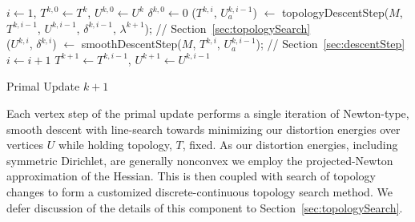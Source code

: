 \begin{algorithm}[h]
\SetAlgoLined
{}
$i \leftarrow 1$, $T^{k,0} \leftarrow T^{k}$, $U^{k,0} \leftarrow U^{k}$\;
$\delta^{k,0} \leftarrow 0$\;
{
	($T^{k,i}$, $U_a^{k,i-1}$) $\leftarrow$ topologyDescentStep($M$, $T^{k,i-1}$, $U^{k,i-1}$, $\delta^{k,i-1}$, $\lambda^{k+1}$); // Section~\ref{sec:topologySearch}\\
	($U^{k,i}$, $\delta^{k,i}$) $\leftarrow$ smoothDescentStep($M$, $T^{k,i}$, $U_a^{k,i-1}$); // Section~\ref{sec:descentStep}\\
	$i \leftarrow i+1$\;
}
$T^{k+1} \leftarrow T^{k,i-1}$, $U^{k+1} \leftarrow U^{k,i-1}$
\caption{Primal Update $k+1$}
\label{alg:DCSearch}
\end{algorithm}

Each vertex step of the primal update performs a single iteration of Newton-type, smooth descent with line-search towards minimizing our distortion energies over vertices $U$ while holding topology, $T$, fixed. As our distortion energies, including symmetric Dirichlet, are generally nonconvex we employ the projected-Newton\ \cite{Teran2005Robust} approximation of the Hessian. This is then coupled with 
search of topology changes to form a customized discrete-continuous topology search method. We defer discussion of the details of this component to Section~\ref{sec:topologySearch}.
%

%

